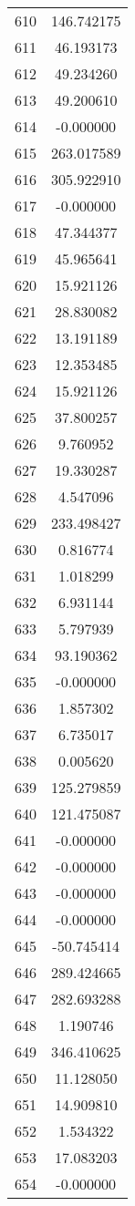 \documentclass[12pt]{article}
\begin{document}
\begin{longtable}{@{}cc@{}}
610 & 146.742175 \\
611 & 46.193173 \\
612 & 49.234260 \\
613 & 49.200610 \\
614 & -0.000000 \\
615 & 263.017589 \\
616 & 305.922910 \\
617 & -0.000000 \\
618 & 47.344377 \\
619 & 45.965641 \\
620 & 15.921126 \\
621 & 28.830082 \\
622 & 13.191189 \\
623 & 12.353485 \\
624 & 15.921126 \\
625 & 37.800257 \\
626 & 9.760952 \\
627 & 19.330287 \\
628 & 4.547096 \\
629 & 233.498427 \\
630 & 0.816774 \\
631 & 1.018299 \\
632 & 6.931144 \\
633 & 5.797939 \\
634 & 93.190362 \\
635 & -0.000000 \\
636 & 1.857302 \\
637 & 6.735017 \\
638 & 0.005620 \\
639 & 125.279859 \\
640 & 121.475087 \\
641 & -0.000000 \\
642 & -0.000000 \\
643 & -0.000000 \\
644 & -0.000000 \\
645 & -50.745414 \\
646 & 289.424665 \\
647 & 282.693288 \\
648 & 1.190746 \\
649 & 346.410625 \\
650 & 11.128050 \\
651 & 14.909810 \\
652 & 1.534322 \\
653 & 17.083203 \\
654 & -0.000000 \\

\end{longtable}
\end{document}
